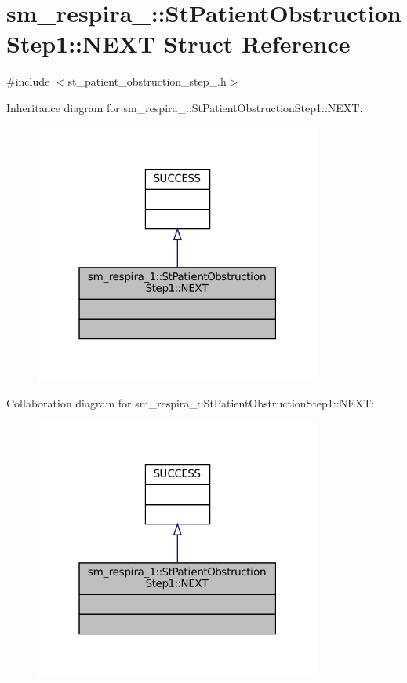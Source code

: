\hypertarget{structsm__respira__1_1_1StPatientObstructionStep1_1_1NEXT}{}\section{sm\+\_\+respira\+\_\+:\+:St\+Patient\+Obstruction\+Step1\+:\+:N\+E\+XT Struct Reference}
\label{structsm__respira__1_1_1StPatientObstructionStep1_1_1NEXT}


{\ttfamily \#include $<$st\+\_\+patient\+\_\+obstruction\+\_\+step\+\_.\+h$>$}



Inheritance diagram for sm\+\_\+respira\+\_\+:\+:St\+Patient\+Obstruction\+Step1\+:\+:N\+E\+XT\+:
\nopagebreak
\begin{figure}[H]
\begin{center}
\leavevmode
\includegraphics[width=268pt]{structsm__respira__1_1_1StPatientObstructionStep1_1_1NEXT__inherit__graph}
\end{center}
\end{figure}


Collaboration diagram for sm\+\_\+respira\+\_\+:\+:St\+Patient\+Obstruction\+Step1\+:\+:N\+E\+XT\+:
\nopagebreak
\begin{figure}[H]
\begin{center}
\leavevmode
\includegraphics[width=268pt]{structsm__respira__1_1_1StPatientObstructionStep1_1_1NEXT__coll__graph}
\end{center}
\end{figure}



